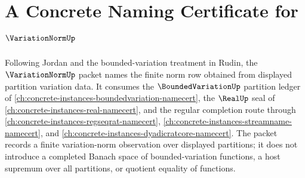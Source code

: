 \chapter{A Concrete Naming Certificate for $\VariationNormUp$}
\label{ch:concrete-instances-variation-norm-namecert}

Following Jordan and the bounded-variation treatment in Rudin, the $\VariationNormUp$ packet names the finite norm row obtained from displayed partition variation data. It consumes the $\BoundedVariationUp$ partition ledger of \autoref{ch:concrete-instances-boundedvariation-namecert}, the $\RealUp$ seal of \autoref{ch:concrete-instances-real-namecert}, and the regular completion route through \autoref{ch:concrete-instances-regseqrat-namecert}, \autoref{ch:concrete-instances-streamname-namecert}, and \autoref{ch:concrete-instances-dyadicratcore-namecert}. The packet records a finite variation-norm observation over displayed partitions; it does not introduce a completed Banach space of bounded-variation functions, a host supremum over all partitions, or quotient equality of functions.

